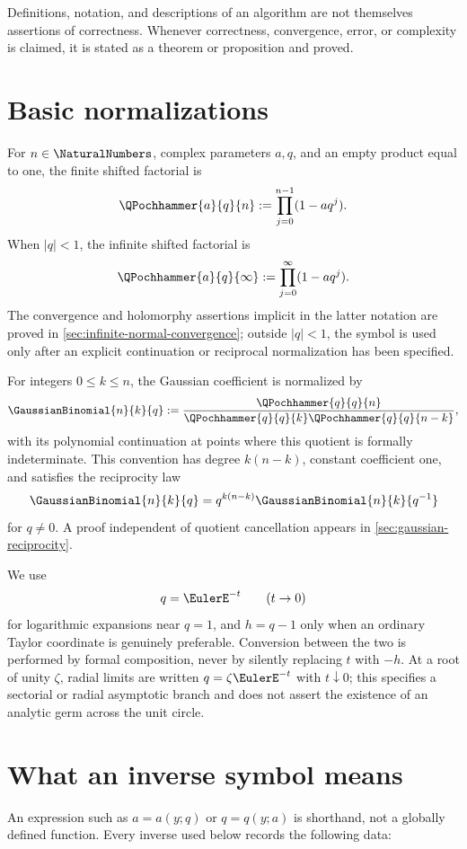 Definitions, notation, and descriptions of an algorithm are not themselves
assertions of correctness.  Whenever correctness, convergence, error, or
complexity is claimed, it is stated as a theorem or proposition and proved.

\section{Basic normalizations}
\label{sec:normalizations}

For \(n\in\NaturalNumbers\), complex parameters \(a,q\), and an empty product equal to one,
the finite shifted factorial is
\[
  \QPochhammer{a}{q}{n}:=\prod_{j=0}^{n-1}(1-aq^j).
\]
When \(|q|<1\), the infinite shifted factorial is
\[
  \QPochhammer{a}{q}{\infty}:=\prod_{j=0}^{\infty}(1-aq^j).
\]
The convergence and holomorphy assertions implicit in the latter notation are
proved in \cref{sec:infinite-normal-convergence}; outside \(|q|<1\), the symbol
is used only after an explicit continuation or reciprocal normalization has
been specified.

For integers \(0\le k\le n\), the Gaussian coefficient is normalized by
\[
  \GaussianBinomial{n}{k}{q}
  :=\frac{\QPochhammer{q}{q}{n}}
  {\QPochhammer{q}{q}{k}\QPochhammer{q}{q}{n-k}},
\]
with its polynomial continuation at points where this quotient is formally
indeterminate.  This convention has degree \(k(n-k)\), constant coefficient
one, and satisfies the reciprocity law
\[
  \GaussianBinomial{n}{k}{q}
  =q^{k(n-k)}\GaussianBinomial{n}{k}{q^{-1}}
\]
for \(q\ne0\).  A proof independent of quotient cancellation appears in
\cref{sec:gaussian-reciprocity}.

We use
\[
  q=\EulerE^{-t}\qquad(t\to0)
\]
for logarithmic expansions near \(q=1\), and \(h=q-1\) only when an ordinary
Taylor coordinate is genuinely preferable.  Conversion between the two is
performed by formal composition, never by silently replacing \(t\) with
\(-h\).  At a root of unity \(\zeta\), radial limits are written
\(q=\zeta\EulerE^{-t}\) with \(t\downarrow0\); this specifies a sectorial or radial
asymptotic branch and does not assert the existence of an analytic germ across
the unit circle.

\section{What an inverse symbol means}
\label{sec:inverse-data}

An expression such as \(a=a(y;q)\) or \(q=q(y;a)\) is shorthand, not a
globally defined function.  Every inverse used below records the following
data:

